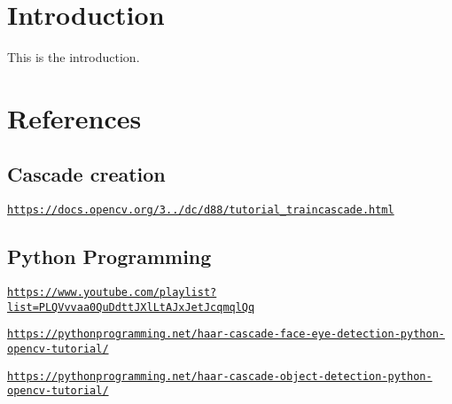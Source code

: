 \hypertarget{index_intro_sec}{}\section{Introduction}\label{index_intro_sec}
This is the introduction.\hypertarget{index_references}{}\section{References}\label{index_references}
\hypertarget{index_cascade_creation}{}\subsection{Cascade creation}\label{index_cascade_creation}

\begin{DoxyItemize}
\item \href{https://docs.opencv.org/3.3.0/dc/d88/tutorial_traincascade.html}{\tt https\+://docs.\+opencv.\+org/3../dc/d88/tutorial\+\_\+traincascade.\+html}
\end{DoxyItemize}\hypertarget{index_python_programming}{}\subsection{Python Programming}\label{index_python_programming}

\begin{DoxyItemize}
\item \href{https://www.youtube.com/playlist?list=PLQVvvaa0QuDdttJXlLtAJxJetJcqmqlQq}{\tt https\+://www.\+youtube.\+com/playlist?list=\+P\+L\+Q\+Vvvaa0\+Qu\+Ddtt\+J\+Xl\+Lt\+A\+Jx\+Jet\+Jcqmql\+Qq}
\item \href{https://pythonprogramming.net/haar-cascade-face-eye-detection-python-opencv-tutorial/}{\tt https\+://pythonprogramming.\+net/haar-\/cascade-\/face-\/eye-\/detection-\/python-\/opencv-\/tutorial/}
\item \href{https://pythonprogramming.net/haar-cascade-object-detection-python-opencv-tutorial/}{\tt https\+://pythonprogramming.\+net/haar-\/cascade-\/object-\/detection-\/python-\/opencv-\/tutorial/} 
\end{DoxyItemize}